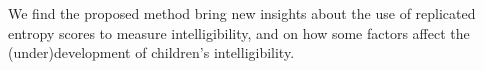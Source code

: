 We find the proposed method bring new insights about the use of replicated entropy scores to measure intelligibility, and on how some factors affect the (under)development of children's intelligibility.

\begin{comment}
	
	Fourth, we implement all of the above in a data set consisting of repeated entropy measures, with the purpose of determine which factors affect the \textit{speech intelligibility} levels of normal hearing (NH) versus hearing-impaired children with cochlear implants (HI/CI). The entropy measures were calculated using the transcriptions of one hundred language students from the University of Antwerp, where each student transcribed the stimuli to the Qualtrics environment \citep{Qualtrics_2005}. The stimuli consisted in ten utterances recordings for each of the thirty two NH and HI/CI children, selected from a large corpus of \textit{spontaneously spoken speech} collected by the Computational Linguistic and Psycholinguistics Research Centre (CLiPS).

On the one hand, the method reveal that, not integrating the bounded nature of the data in the modeling procedure could lead us to wrongful statistical conclusions. More precisely, it could lead us to an overestimation of the parameter estimates' precision.

Lastly, our hypothesis tests reveal that hearing impaired children with cochlear implants (HI/CI) and genetic etiology have similar levels of intelligibility as normal hearing kids (NH), when both groups have a `hearing ages' of five. However, the same cannot be said for children with other etiologies, like CMV infection or other causes, as they start a significantly lower level of intelligibility at same `ages'. Moreover, our tests found enough evidence to assert that NH children develop their intelligibility with each `hearing year' at a higher rate than HI/CI kids. This offer evidence contrary to what was previously found \citep{Boonen_et_al_2021}.

Finally, we observe our results support the hypothesis that HI/CI children with severe hearing loss, as accounted by the pure tone average, develop their language at a slower rate than their NH counterparts.

\end{comment}
%
%
